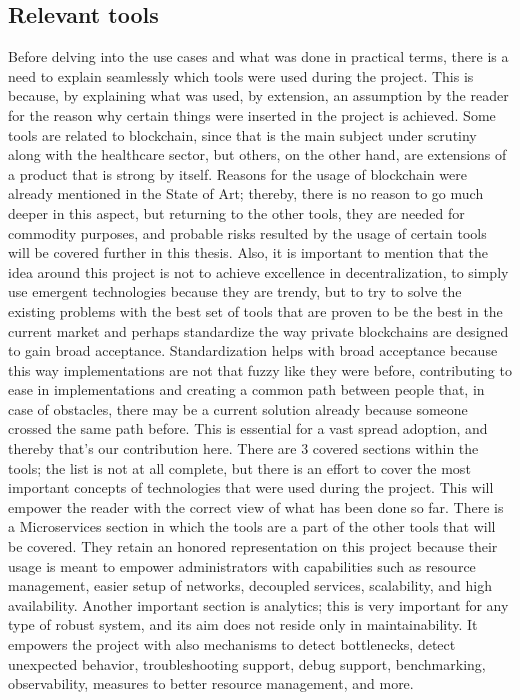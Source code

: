 \subsection{Relevant tools}

Before delving into the use cases and what was done in practical terms, there is a need to explain seamlessly which tools were used during the project. This is because, by explaining what was used, by extension, an assumption by the reader for the reason why certain things were inserted in the project is achieved. Some tools are related to blockchain, since that is the main subject under scrutiny along with the healthcare sector, but others, on the other hand, are extensions of a product that is strong by itself. Reasons for the usage of blockchain were already mentioned in the State of Art; thereby, there is no reason to go much deeper in this aspect, but returning to the other tools, they are needed for commodity purposes, and probable risks resulted by the usage of certain tools will be covered further in this thesis. Also, it is important to mention that the idea around this project is not to achieve excellence in decentralization, to simply use emergent technologies because they are trendy, but to try to solve the existing problems with the best set of tools that are proven to be the best in the current market and perhaps standardize the way private blockchains are designed to gain broad acceptance. Standardization helps with broad acceptance because this way implementations are not that fuzzy like they were before, contributing to ease in implementations and creating a common path between people that, in case of obstacles, there may be a current solution already because someone crossed the same path before. This is essential for a vast spread adoption, and thereby that's our contribution here.
There are 3 covered sections within the tools; the list is not at all complete, but there is an effort to cover the most important concepts of technologies that were used during the project. This will empower the reader with the correct view of what has been done so far.
There is a Microservices section in which the tools are a part of the other tools that will be covered. They retain an honored representation on this project because their usage is meant to empower administrators with capabilities such as resource management, easier setup of networks, decoupled services, scalability, and high availability.
Another important section is analytics; this is very important for any type of robust system, and its aim does not reside only in maintainability. It empowers the project with also mechanisms to detect bottlenecks, detect unexpected behavior, troubleshooting support, debug support, benchmarking, observability, measures to better resource management, and more.

